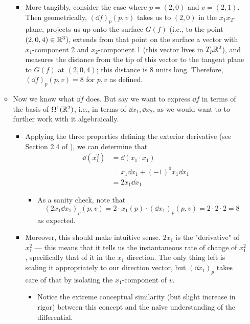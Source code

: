 \documentclass[../notes.tex]{subfiles}
\begin{document}
\begin{itemize}
\begin{itemize}
        \begin{itemize}
            \item More tangibly, consider the case where $p=(2,0)$ and $v=(2,1)$. Then geometrically, $(\dd{f})_p(p,v)$ takes us to $(2,0)$ in the $x_1x_2$-plane, projects us up onto the surface $G(f)$ (i.e., to the point $(2,0,4)\in\R^3$), extends from that point on the surface a vector with $x_1$-component 2 and $x_2$-component 1 (this vector lives in $T_p\R^2$), and measures the distance from the tip of this vector to the tangent plane to $G(f)$ at $(2,0,4)$; this distance is 8 units long. Therefore, $(\dd{f})_p(p,v)=8$ for $p,v$ as defined.
        \end{itemize}
        \item Now we know what $\dd{f}$ does. But say we want to express $\dd{f}$ in terms of the basis of $\ome[1]{\R^2}$, i.e., in terms of $\dd{x_1},\dd{x_2}$, as we would want to to further work with it algebraically.
        \begin{itemize}
            \item Applying the three properties defining the exterior derivative (see Section 2.4 of \textcite{bib:DifferentialForms}), we can determine that
            \begin{align*}
                \dd(x_1^2) &= \dd(x_1\cdot x_1)\\
                &= x_1\dd{x_1}+(-1)^0x_1\dd{x_1}\\
                &= 2x_1\dd{x_1}
            \end{align*}
            \begin{itemize}
                \item As a sanity check, note that
                \begin{equation*}
                    (2x_1\dd{x_1})_p(p,v) = 2\cdot x_1(p)\cdot(\dd{x_1})_p(p,v)
                    = 2\cdot 2\cdot 2=8
                \end{equation*}
                as expected.
            \end{itemize}
            \item Moreover, this should make intuitive sense. $2x_1$ is the "derivative" of $x_1^2$ --- this means that it tells us the instantaneous rate of change of $x_1^2$, specifically that of it in the $x_1$ direction. The only thing left is scaling it appropriately to our direction vector, but $(\dd{x_1})_p$ takes care of that by isolating the $x_1$-component of $v$.
            \begin{itemize}
                \item Notice the extreme conceptual similarity (but slight increase in rigor) between this concept and the na\"{i}ve understanding of the differential.

\end{itemize}
\end{itemize}
\end{itemize}
\end{itemize}
\end{document}
